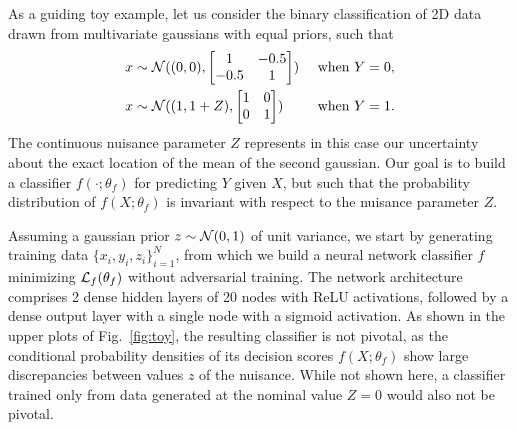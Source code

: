 \documentclass[twocolumn,superscriptaddress,aps]{revtex4-1}
\theoremstyle{plain}
\begin{document}
As a guiding toy example, let us consider the binary classification of 2D
data drawn from multivariate gaussians with equal priors, such that
\begin{align}
    x &\sim {\cal N}((0,0), \begin{bmatrix}
                              1 & -0.5 \\
                              -0.5 & 1
                            \end{bmatrix}) &\text{ when } Y=0, \\
    x &\sim {\cal N}((1,1+Z),  \begin{bmatrix}
                              1 & 0 \\
                              0 & 1
                             \end{bmatrix}) &\text{ when } Y=1.
\end{align}
The continuous nuisance parameter $Z$ represents in this case our
uncertainty about the exact location of the mean of the second gaussian. Our goal is to
build a classifier $f(\cdot;\theta_f)$ for predicting $Y$ given $X$, but such that
the probability distribution of $f(X;\theta_f)$ is invariant with respect to the
nuisance parameter $Z$.

Assuming a gaussian prior $z \sim {\cal N}(0,1)$ of unit variance, we start by
generating training data $\{ x_i, y_i, z_i \}_{i=1}^N$, from which we build a
neural network classifier $f$ minimizing ${\cal L}_f(\theta_f)$ without
adversarial training. The network architecture comprises 2 dense hidden layers of 20
nodes with ReLU activations, followed  by a dense output layer with a single
node with a sigmoid activation. As shown in the upper plots of
Fig.~\ref{fig:toy}, the resulting classifier is not pivotal, as the
conditional probability densities of its decision scores $f(X;\theta_f)$ show
large discrepancies between values $z$ of the nuisance. While not shown here, a
classifier trained only from data generated at the nominal value $Z=0$ would
also not be pivotal.
\end{document}
